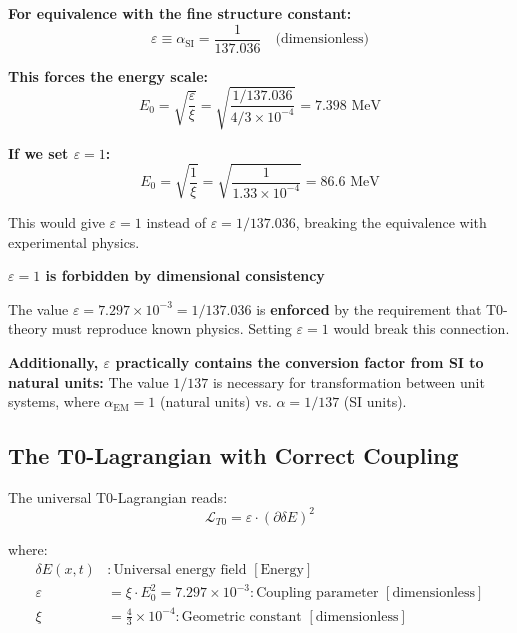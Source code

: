 \documentclass[12pt,a4paper]{article}
\numberwithin{equation}{section}
\newcommand{\xipar}{\xi}
\newcommand{\epsilonT}{\varepsilon}
\newcommand{\alphaSI}{\alpha_{\text{SI}}}
\newcommand{\calL}{\mathcal{L}}
\newcommand{\Eo}{E_0}
\begin{document}
	\textbf{For equivalence with the fine structure constant:}
	\begin{equation}
		\epsilonT \equiv \alphaSI = \frac{1}{137.036} \quad \text{(dimensionless)}
		\label{eq:equivalence_simple}
	\end{equation}
	
	\textbf{This forces the energy scale:}
	\begin{equation}
		\Eo = \sqrt{\frac{ \epsilonT}{\xipar}} = \sqrt{\frac{1/137.036}{4/3 \times 10^{-4}}} = 7.398 \text{ MeV}
		\label{eq:e0_forced}
	\end{equation}
	
	\textbf{If we set $\epsilonT = 1$:}
	\begin{equation}
		\Eo = \sqrt{\frac{1}{\xipar}} = \sqrt{\frac{1}{1.33 \times 10^{-4}}} = 86.6 \text{ MeV}
		\label{eq:e0_wrong}
	\end{equation}
	
	This would give $\epsilonT = 1$ instead of $\epsilonT = 1/137.036$, breaking the equivalence with experimental physics.
	
\begin{tcolorbox}[title={\textbf{CONCLUSION}},colframe=blue,colback=blue!5]
	\textbf{$\epsilonT = 1$ is forbidden by dimensional consistency}
	
	The value $\epsilonT = 7.297 \times 10^{-3} = 1/137.036$ is \textbf{enforced} by the requirement that T0-theory must reproduce known physics. Setting $\epsilonT = 1$ would break this connection.
	
	\textbf{Additionally, $\epsilonT$ practically contains the conversion factor from SI to natural units:} The value $1/137$ is necessary for transformation between unit systems, where $\alpha_{\text{EM}} = 1$ (natural units) vs. $\alpha = 1/137$ (SI units).
\end{tcolorbox}
	
	
	
	
	
	\subsection{The T0-Lagrangian with Correct Coupling}
	
	The universal T0-Lagrangian reads:
	\begin{equation}
		\calL_{T0} = \epsilonT \cdot (\partial \delta E)^2
		\label{eq:t0_lagrangian}
	\end{equation}
	
	where:
	\begin{align}
		\delta E(x,t) &: \text{Universal energy field } [\text{Energy}]\\
		\epsilonT &= \xipar \cdot \Eo^2 = 7.297 \times 10^{-3} : \text{Coupling parameter } [\text{dimensionless}]\\
		\xipar &= \frac{4}{3} \times 10^{-4} : \text{Geometric constant } [\text{dimensionless}]
	\end{align}
	
\end{document}
